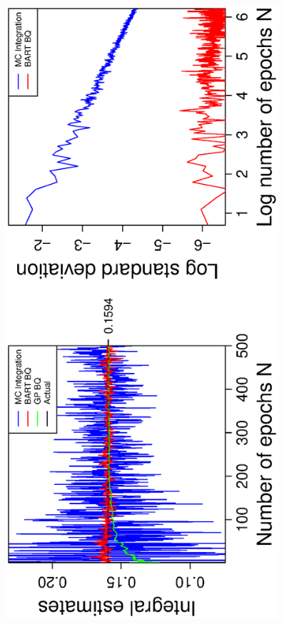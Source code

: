 \vspace{-0.5cm}
\begin{figure}[H]
  \centering
  \hspace{-1.6cm}
  \begin{minipage}[b]{0.4\textwidth}
    \includegraphics[width = 0.9\textwidth, angle = -90]{report/Figures/5/convergenceMean510Dimensions.eps}

\end{minipage}
\end{figure}
